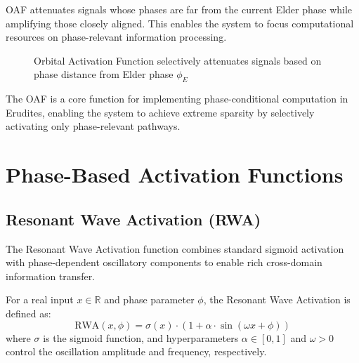 OAF attenuates signals whose phases are far from the current Elder phase while amplifying those closely aligned. This enables the system to focus computational resources on phase-relevant information processing.

\begin{figure}[h]
\centering
{}
\caption{Orbital Activation Function selectively attenuates signals based on phase distance from Elder phase $\phi_E$}
\end{figure}

The OAF is a core function for implementing phase-conditional computation in Erudites, enabling the system to achieve extreme sparsity by selectively activating only phase-relevant pathways.

\section{Phase-Based Activation Functions}

\subsection{Resonant Wave Activation (RWA)}

The Resonant Wave Activation function combines standard sigmoid activation with phase-dependent oscillatory components to enable rich cross-domain information transfer.

\begin{definition}
For a real input $x \in \mathbb{R}$ and phase parameter $\phi$, the Resonant Wave Activation is defined as:
\begin{equation}
\text{RWA}(x, \phi) = \sigma(x) \cdot (1 + \alpha \cdot \sin(\omega x + \phi))
\end{equation}
where $\sigma$ is the sigmoid function, and hyperparameters $\alpha \in [0,1]$ and $\omega > 0$ control the oscillation amplitude and frequency, respectively.
\end{definition}

